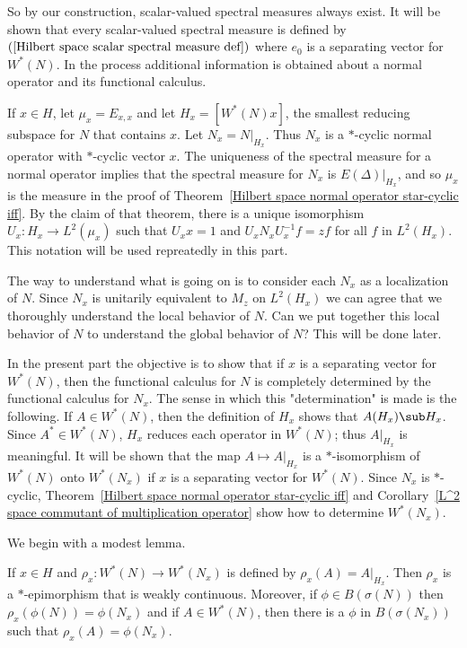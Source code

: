 So by our construction, scalar-valued spectral measures always exist. It will be shown that every scalar-valued spectral measure is defined by $(\ref{Hilbert space scalar spectral measure def})$ where $e_0$ is a separating vector for $W^*(N)$. In the process additional information is obtained about a normal operator and its functional calculus.\par
If $x\in H$, let $\mu_x=E_{x,x}$ and let $H_x=[W^*(N)x]$, the smallest reducing subspace for $N$ that contains $x$. Let $N_x=N|_{H_x}$. Thus $N_x$ is a $*$-cyclic normal operator with $*$-cyclic vector $x$. The uniqueness of the spectral measure for a normal operator implies that the spectral measure for $N_x$ is $E(\Delta)|_{H_x}$, and so $\mu_x$ is the measure in the proof of Theorem~\ref{Hilbert space normal operator star-cyclic iff}. By the claim of that theorem, there is a unique isomorphism $U_x:H_x\to L^2(\mu_x)$ such that $U_xx=1$ and $U_xN_xU_x^{-1}f=zf$ for all $f$ in $L^2(H_x)$. This notation will be used repreatedly in this part.\par
The way to understand what is going on is to consider each $N_x$ as a localization of $N$. Since $N_x$ is unitarily equivalent to $M_z$ on $L^2(H_x)$ we can agree that we thoroughly understand the local behavior of $N$. Can we put together this local behavior of $N$ to understand the global behavior of $N$? This will be done later.\par
In the present part the objective is to show that if $x$ is a separating vector for $W^*(N)$, then the functional calculus for $N$ is completely determined by the functional calculus for $N_x$. The sense in which this "determination" is made is the following. If $A\in W^*(N)$, then the definition of $H_x$ shows that $A(H_x)\sub H_x$. Since $A^*\in W^*(N)$, $H_x$ reduces each operator in $W^*(N)$; thus $A|_{H_x}$ is meaningful. It will be shown that the map $A\mapsto A|_{H_x}$ is a $*$-isomorphism of $W^*(N)$ onto $W^*(N_x)$ if $x$ is a separating vector for $W^*(N)$. Since $N_x$ is $*$-cyclic, Theorem~\ref{Hilbert space normal operator star-cyclic iff} and Corollary~\ref{L^2 space commutant of multiplication operator} show how to determine $W^*(N_x)$.\par
We begin with a modest lemma.
\begin{lemma}\label{Hilbert space restriction on von Neumann algebra}
If $x\in H$ and $\rho_x:W^*(N)\to W^*(N_x)$ is defined by $\rho_x(A)=A|_{H_x}$. Then $\rho_x$ is a $*$-epimorphism that is weakly continuous. Moreover, if $\phi\in B(\sigma(N))$ then $\rho_x(\phi(N))=\phi(N_x)$ and if $A\in W^*(N)$, then there is a $\phi$ in $B(\sigma(N_x))$ such that $\rho_x(A)=\phi(N_x)$.
\end{lemma}
